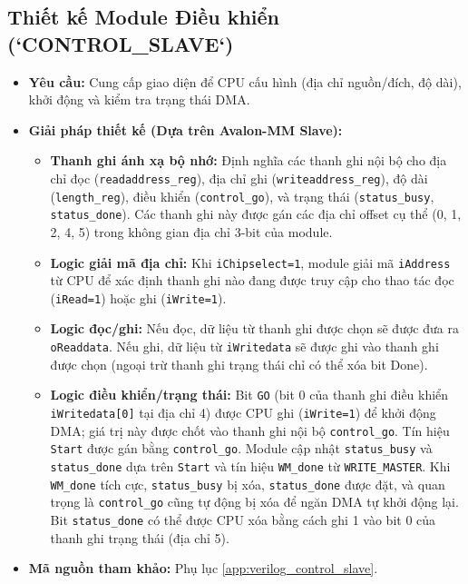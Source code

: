 \subsection{Thiết kế Module Điều khiển (`CONTROL\_SLAVE`)}
\begin{itemize}
    \item \textbf{Yêu cầu:} Cung cấp giao diện để CPU cấu hình (địa chỉ nguồn/đích, độ dài), khởi động và kiểm tra trạng thái DMA.
    \item \textbf{Giải pháp thiết kế (Dựa trên Avalon-MM Slave):}
        \begin{itemize}
            \item \textbf{Thanh ghi ánh xạ bộ nhớ:} Định nghĩa các thanh ghi nội bộ cho địa chỉ đọc (\texttt{readaddress\_reg}), địa chỉ ghi (\texttt{writeaddress\_reg}), độ dài (\texttt{length\_reg}), điều khiển (\texttt{control\_go}), và trạng thái (\texttt{status\_busy}, \texttt{status\_done}). Các thanh ghi này được gán các địa chỉ offset cụ thể (0, 1, 2, 4, 5) trong không gian địa chỉ 3-bit của module.
            \item \textbf{Logic giải mã địa chỉ:} Khi \texttt{iChipselect=1}, module giải mã \texttt{iAddress} từ CPU để xác định thanh ghi nào đang được truy cập cho thao tác đọc (\texttt{iRead=1}) hoặc ghi (\texttt{iWrite=1}).
            \item \textbf{Logic đọc/ghi:} Nếu đọc, dữ liệu từ thanh ghi được chọn sẽ được đưa ra \texttt{oReaddata}. Nếu ghi, dữ liệu từ \texttt{iWritedata} sẽ được ghi vào thanh ghi được chọn (ngoại trừ thanh ghi trạng thái chỉ có thể xóa bit Done).
            \item \textbf{Logic điều khiển/trạng thái:} Bit \texttt{GO} (bit 0 của thanh ghi điều khiển \texttt{iWritedata[0]} tại địa chỉ 4) được CPU ghi (\texttt{iWrite=1}) để khởi động DMA; giá trị này được chốt vào thanh ghi nội bộ \texttt{control\_go}. Tín hiệu \texttt{Start} được gán bằng \texttt{control\_go}. Module cập nhật \texttt{status\_busy} và \texttt{status\_done} dựa trên \texttt{Start} và tín hiệu \texttt{WM\_done} từ \texttt{WRITE\_MASTER}. Khi \texttt{WM\_done} tích cực, \texttt{status\_busy} bị xóa, \texttt{status\_done} được đặt, và quan trọng là \texttt{control\_go} cũng tự động bị xóa để ngăn DMA tự khởi động lại. Bit \texttt{status\_done} có thể được CPU xóa bằng cách ghi 1 vào bit 0 của thanh ghi trạng thái (địa chỉ 5).
        \end{itemize}
    \item \textbf{Mã nguồn tham khảo:} Phụ lục \ref{app:verilog_control_slave}.
\end{itemize}

